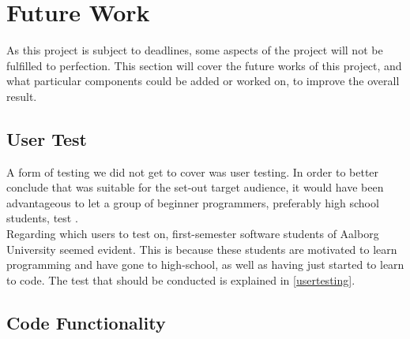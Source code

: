 
\section{Future Work}
As this project is subject to deadlines, some aspects of the project will not be fulfilled to perfection. This section will cover the future works of this project, and what particular components could be added or worked on, to improve the overall result.

\subsection{User Test} \label{futurework:Usertesting}
A form of testing we did not get to cover was user testing. In order to better conclude that \lang was suitable for the set-out target audience, it would have been advantageous to let a group of beginner programmers, preferably high school students, test \lang. \\
Regarding which users to test on, first-semester software students of Aalborg University seemed evident. This is because these students are motivated to learn programming and have gone to high-school, as well as having just started to learn to code. The test that should be conducted is explained in \ref{usertesting}.\\

\subsection{Code Functionality}


